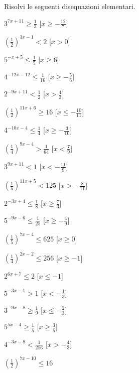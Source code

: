 \begin{esercizio}\label{ese:}
 Risolvi le seguenti disequazioni elementari.
 \begin{multicols}{2}
 \begin{enumeratea}
  \item  \(3^{7 x +11} \geqslant \frac{1}{3}\)
   \hfill [\(x \geqslant -\frac{12}{7}\)]
  \item  \(\left(\frac{1}{2}\right)^{3 x -1} < 2\)
   \hfill [\(x > 0\)]
  \item  \(5^{- x +5} \leqslant \frac{1}{5}\)
   \hfill [\(x \geqslant 6\)]
  \item  \(4^{-12 x -12} \leqslant \frac{1}{16}\)
   \hfill [\(x \geqslant -\frac{5}{6}\)]
  \item  \(2^{-9 x +11} < \frac{1}{2}\)
   \hfill [\(x > \frac{4}{3}\)]
  \item  \(\left(\frac{1}{2}\right)^{11 x +6} \geqslant 16\)
   \hfill [\(x \leqslant -\frac{10}{11}\)]
  \item  \(4^{-10 x -4} \leqslant \frac{1}{4}\)
   \hfill [\(x \geqslant -\frac{3}{10}\)]
  \item  \(\left(\frac{1}{4}\right)^{9 x -4} > \frac{1}{64}\)
   \hfill [\(x < \frac{7}{9}\)]
  \item  \(3^{9 x +11} < 1\)
   \hfill [\(x < -\frac{11}{9}\)]
  \item  \(\left(\frac{1}{5}\right)^{11 x +5} < 125\)
   \hfill [\(x > -\frac{8}{11}\)]
  \item  \(2^{-3 x +4} \leqslant \frac{1}{8}\)
   \hfill [\(x \geqslant \frac{7}{3}\)]
  \item  \(5^{-9 x -6} \leqslant \frac{1}{25}\)
   \hfill [\(x \geqslant -\frac{4}{9}\)]
  \item  \(\left(\frac{1}{5}\right)^{7 x -4} \leqslant 625\)
   \hfill [\(x \geqslant 0\)]
  \item  \(\left(\frac{1}{4}\right)^{2 x -2} \leqslant 256\)
   \hfill [\(x \geqslant -1\)]
  \item  \(2^{6 x +7} \leqslant 2\)
   \hfill [\(x \leqslant -1\)]
  \item  \(5^{-3 x -1} > 1\)
   \hfill [\(x < -\frac{1}{3}\)]
  \item  \(3^{-9 x -8} \geqslant \frac{1}{9}\)
   \hfill [\(x \leqslant -\frac{2}{3}\)]
  \item  \(5^{5 x -4} \geqslant \frac{1}{5}\)
   \hfill [\(x \geqslant \frac{3}{5}\)]
  \item  \(4^{-3 x -8} < \frac{1}{256}\)
   \hfill [\(x > -\frac{4}{3}\)]
  \item  \(\left(\frac{1}{2}\right)^{7 x -10} \leqslant 16\)

\end{enumeratea}
\end{multicols}
\end{esercizio}

